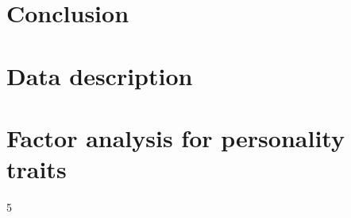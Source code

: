 \documentclass[a4paper, 11pt, onecolumn]{article}
\begin{document}
\newpage
\section{Conclusion}

% 

\clearpage
\newpage




\newpage
\appendix

\section{Data description}



\section{Factor analysis for personality traits}
\label{section:efa_big5}

%















\clearpage
\newpage
\setcounter{tocdepth}5
\tableofcontents

\end{document}
